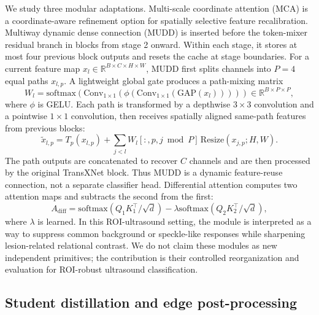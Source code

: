 \documentclass[preprint,12pt]{elsarticle}
\begin{document}
We study three modular adaptations. Multi-scale coordinate attention (MCA) is a coordinate-aware refinement option for spatially selective feature recalibration. Multiway dynamic dense connection (MUDD) is inserted before the token-mixer residual branch in blocks from stage 2 onward. Within each stage, it stores at most four previous block outputs and resets the cache at stage boundaries. For a current feature map $x_l\in\mathbb{R}^{B\times C\times H\times W}$, MUDD first splits channels into $P=4$ equal paths $x_{l,p}$. A lightweight global gate produces a path-mixing matrix
\begin{equation}
    W_l=\mathrm{softmax}\left(
    \mathrm{Conv}_{1\times1}\left(
    \phi(\mathrm{Conv}_{1\times1}(\mathrm{GAP}(x_l)))
    \right)\right)\in\mathbb{R}^{B\times P\times P},
\end{equation}
where $\phi$ is GELU. Each path is transformed by a depthwise $3\times3$ convolution and a pointwise $1\times1$ convolution, then receives spatially aligned same-path features from previous blocks:
\begin{equation}
    \tilde{x}_{l,p}=T_p(x_{l,p})+
    \sum_{j<l} W_l[:,p,j\bmod P]\,
    \mathrm{Resize}(x_{j,p};H,W).
\end{equation}
The path outputs are concatenated to recover $C$ channels and are then processed by the original TransXNet block. Thus MUDD is a dynamic feature-reuse connection, not a separate classifier head. Differential attention computes two attention maps and subtracts the second from the first:
\begin{equation}
    A_{\mathrm{diff}} =
    \mathrm{softmax}(Q_1K_1^\top/\sqrt{d})
    - \lambda\mathrm{softmax}(Q_2K_2^\top/\sqrt{d}),
\end{equation}
where $\lambda$ is learned. In this ROI-ultrasound setting, the module is interpreted as a way to suppress common background or speckle-like responses while sharpening lesion-related relational contrast. We do not claim these modules as new independent primitives; the contribution is their controlled reorganization and evaluation for ROI-robust ultrasound classification.

\subsection{Student distillation and edge post-processing}
\end{document}
